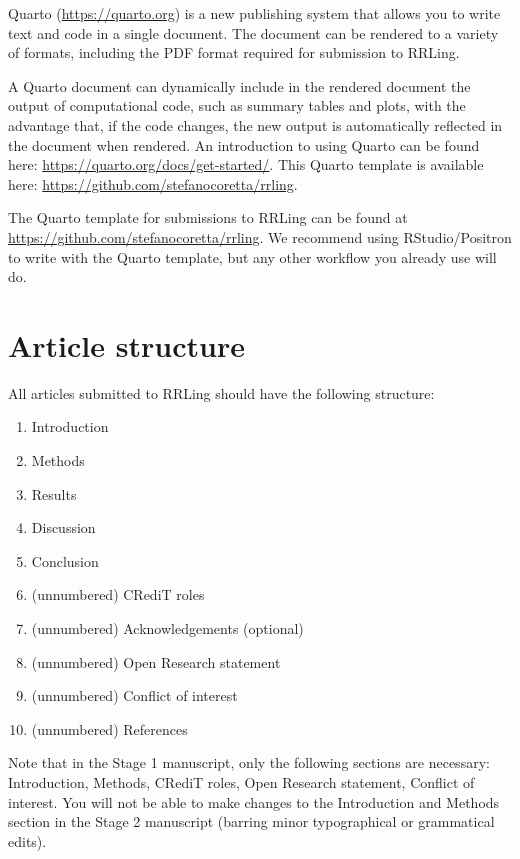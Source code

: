 \documentclass[
]{rrling}
\begin{document}
Quarto (\url{https://quarto.org}) is a new publishing system that allows
you to write text and code in a single document. The document can be
rendered to a variety of formats, including the PDF format required for
submission to RRLing.

A Quarto document can dynamically include in the rendered document the
output of computational code, such as summary tables and plots, with the
advantage that, if the code changes, the new output is automatically
reflected in the document when rendered. An introduction to using Quarto
can be found here: \url{https://quarto.org/docs/get-started/}. This
Quarto template is available here:
\url{https://github.com/stefanocoretta/rrling}.

The Quarto template for submissions to RRLing can be found at
\url{https://github.com/stefanocoretta/rrling}. We recommend using
RStudio/Positron to write with the Quarto template, but any other
workflow you already use will do.

\section*{Article structure}\label{article-structure}

All articles submitted to RRLing should have the following structure:

\begin{enumerate}
\def\labelenumi{\arabic{enumi}.}
\item
  Introduction
\item
  Methods
\item
  Results
\item
  Discussion
\item
  Conclusion
\item
  (unnumbered) CRediT roles
\item
  (unnumbered) Acknowledgements (optional)
\item
  (unnumbered) Open Research statement
\item
  (unnumbered) Conflict of interest
\item
  (unnumbered) References
\end{enumerate}

Note that in the Stage 1 manuscript, only the following sections are
necessary: Introduction, Methods, CRediT roles, Open Research statement,
Conflict of interest. You will not be able to make changes to the
Introduction and Methods section in the Stage 2 manuscript (barring
minor typographical or grammatical edits).
\end{document}
